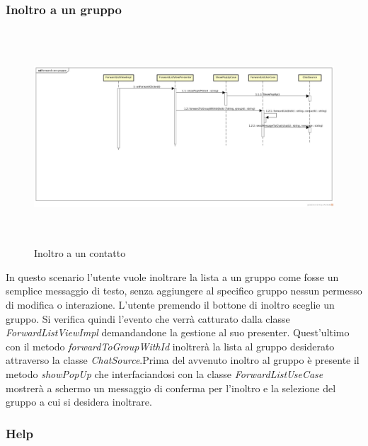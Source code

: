 \subsubsection{Inoltro a un gruppo}

\label{Inoltro a un contatto}
\begin{figure}[H]
	\centering
	\includegraphics[width=12cm, height=8cm]{Sezioni/Diagrammi/img_app/forward_con_gruppo.jpg}
	\caption{Inoltro a un contatto}
	
\end{figure}

In questo scenario l'utente vuole inoltrare la lista a un gruppo come fosse un semplice messaggio di testo, senza aggiungere al specifico gruppo nessun permesso di modifica o interazione. L'utente premendo il bottone di inoltro sceglie un gruppo. Si verifica quindi l'evento che verrà catturato dalla classe \textit{ForwardListViewImpl} demandandone la gestione al suo presenter.
Quest'ultimo con il metodo \textit{forwardToGroupWithId} inoltrerà la lista al gruppo desiderato attraverso la classe \textit{ChatSource}.Prima del avvenuto inoltro al gruppo è presente il metodo \textit{showPopUp} che interfaciandosi con la classe \textit{ForwardListUseCase} mostrerà a schermo un messaggio di conferma per l'inoltro e la selezione del gruppo a cui si desidera inoltrare.


\subsubsection{Help}

